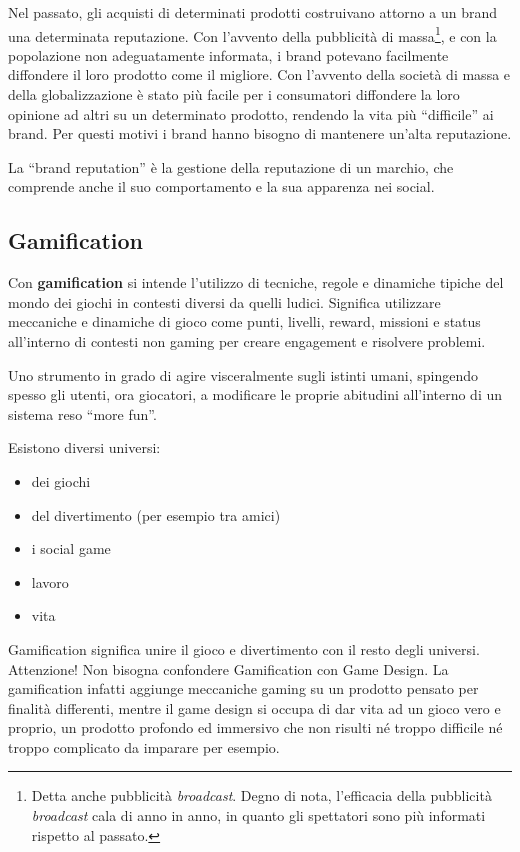 Nel passato, gli acquisti di determinati prodotti costruivano attorno a un
brand una determinata reputazione. Con l'avvento della pubblicità di
massa\footnote{Detta anche pubblicità \textit{broadcast}. Degno di nota,
l'efficacia della pubblicità \textit{broadcast} cala di anno in anno, in
quanto gli spettatori sono più informati rispetto al passato.}, e con la
popolazione non adeguatamente informata, i brand potevano facilmente
diffondere il loro prodotto come il migliore.
Con l'avvento della società di massa e della globalizzazione è stato più
facile per i consumatori diffondere la loro opinione ad altri su un determinato
prodotto, rendendo la vita più ``difficile'' ai brand.
Per questi motivi i brand hanno bisogno di mantenere un'alta reputazione.

La ``brand reputation'' è la gestione della reputazione di un marchio, che
comprende anche il suo comportamento e la sua apparenza nei social.

\subsection{Gamification}

Con \textbf{gamification} si intende l'utilizzo di tecniche, regole e dinamiche
tipiche del mondo dei giochi in contesti diversi da quelli ludici.
Significa utilizzare meccaniche e dinamiche di gioco come punti, livelli,
reward, missioni e status all'interno di contesti non gaming per creare
engagement e risolvere problemi.

Uno strumento in grado di agire visceralmente sugli istinti umani, spingendo
spesso gli utenti, ora giocatori, a modificare le proprie abitudini all’interno
di un sistema reso ``more fun''.

Esistono diversi universi:
\begin{itemize}
 \item dei giochi
 \item del divertimento (per esempio tra amici)
 \item i social game
 \item lavoro
 \item vita
\end{itemize}

Gamification significa unire il gioco e divertimento con il resto degli
universi. Attenzione! Non bisogna confondere Gamification con Game Design. La
gamification infatti aggiunge meccaniche gaming su un prodotto pensato per
finalità differenti, mentre il game design si occupa di dar vita ad un gioco
vero e proprio, un prodotto profondo ed immersivo che non risulti né troppo
difficile né troppo complicato da imparare per esempio.

